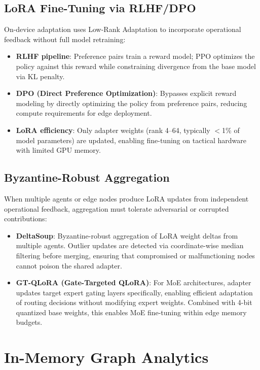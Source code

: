\documentclass[11pt,letterpaper]{article}
\begin{document}
\subsection{LoRA Fine-Tuning via RLHF/DPO}

On-device adaptation uses Low-Rank Adaptation to incorporate operational feedback without full model retraining:

\begin{itemize}
\item \textbf{RLHF pipeline}: Preference pairs train a reward model; PPO optimizes the policy against this reward while constraining divergence from the base model via KL penalty.
\item \textbf{DPO (Direct Preference Optimization)}: Bypasses explicit reward modeling by directly optimizing the policy from preference pairs, reducing compute requirements for edge deployment.
\item \textbf{LoRA efficiency}: Only adapter weights (rank 4--64, typically $<$1\% of model parameters) are updated, enabling fine-tuning on tactical hardware with limited GPU memory.
\end{itemize}

\subsection{Byzantine-Robust Aggregation}

When multiple agents or edge nodes produce LoRA updates from independent operational feedback, aggregation must tolerate adversarial or corrupted contributions:

\begin{itemize}
\item \textbf{DeltaSoup}: Byzantine-robust aggregation of LoRA weight deltas from multiple agents. Outlier updates are detected via coordinate-wise median filtering before merging, ensuring that compromised or malfunctioning nodes cannot poison the shared adapter.
\item \textbf{GT-QLoRA (Gate-Targeted QLoRA)}: For MoE architectures, adapter updates target expert gating layers specifically, enabling efficient adaptation of routing decisions without modifying expert weights. Combined with 4-bit quantized base weights, this enables MoE fine-tuning within edge memory budgets.
\end{itemize}

\section{In-Memory Graph Analytics}
\end{document}
